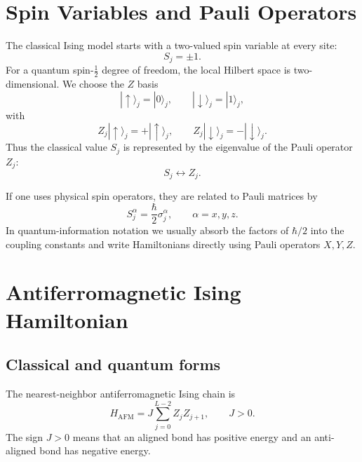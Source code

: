 \documentclass[11pt]{article}
\newcommand{\ket}[1]{|#1\rangle}
\newcommand{\up}{\uparrow}
\newcommand{\down}{\downarrow}
\begin{document}
\section{Spin Variables and Pauli Operators}

The classical Ising model starts with a two-valued spin variable at every site:
\begin{equation}
  S_j=\pm 1.
\end{equation}
For a quantum spin-$\frac{1}{2}$ degree of freedom, the local Hilbert space is
two-dimensional. We choose the $Z$ basis
\begin{equation}
  \ket{\up}_j=\ket{0}_j,
  \qquad
  \ket{\down}_j=\ket{1}_j,
\end{equation}
with
\begin{equation}
  Z_j\ket{\up}_j=+\ket{\up}_j,
  \qquad
  Z_j\ket{\down}_j=-\ket{\down}_j.
\end{equation}
Thus the classical value $S_j$ is represented by the eigenvalue of the Pauli
operator $Z_j$:
\begin{equation}
  S_j \longleftrightarrow Z_j.
\end{equation}

If one uses physical spin operators, they are related to Pauli matrices by
\begin{equation}
  S_j^\alpha=\frac{\hbar}{2}\sigma_j^\alpha,
  \qquad \alpha=x,y,z.
\end{equation}
In quantum-information notation we usually absorb the factors of $\hbar/2$
into the coupling constants and write Hamiltonians directly using Pauli
operators $X,Y,Z$.

\section{Antiferromagnetic Ising Hamiltonian}

\subsection{Classical and quantum forms}

The nearest-neighbor antiferromagnetic Ising chain is
\begin{equation}
  H_{\mathrm{AFM}}
  = J\sum_{j=0}^{L-2}Z_jZ_{j+1},
  \qquad J>0.
  \label{eq:afm-ising}
\end{equation}
The sign $J>0$ means that an aligned bond has positive energy and an
anti-aligned bond has negative energy.
\end{document}
